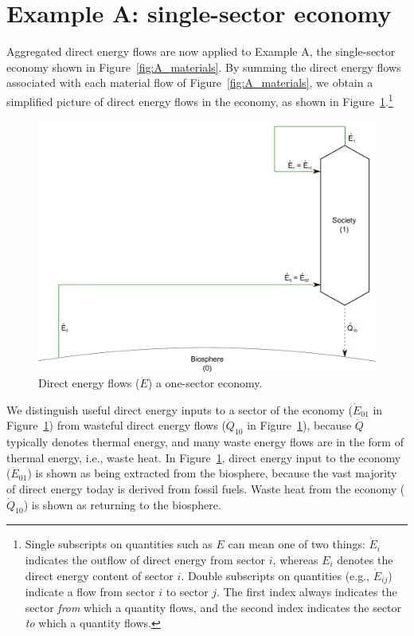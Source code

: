 \section{Example A: single-sector economy} %
\label{sec:A_energy}

Aggregated direct energy flows are now applied to Example A, 
the single-sector economy shown in Figure~\ref{fig:A_materials}.
By summing the direct energy flows associated with
each material flow of Figure~\ref{fig:A_materials}, we obtain
a simplified picture of direct energy flows in the economy,
as shown in Figure~\ref{fig:A_energy}.\footnote{Single 
subscripts on quantities such as
$E$ can mean one of two things: 
$\dot{E}_{i}$ indicates the outflow of direct energy from sector $i$, 
whereas $E_{i}$ denotes the direct energy content of sector $i$. 
Double subscripts on quantities
(e.g., $\dot{E}_{ij}$) indicate a flow 
from sector $i$ to sector $j$. 
The first index always indicates the sector \emph{from} which a quantity flows, 
and the second index indicates the sector \emph{to} which a quantity flows.}

\begin{figure}[!ht]
\centering
\includegraphics[width=0.8\linewidth]{Part_1/Chapter_Energy/images/1_sector_direct_energy.pdf}
\caption[Direct energy flows a one-sector economy]{Direct energy flows ($\dot{E}$) a one-sector economy.}
\label{fig:A_energy}
\end{figure}

We distinguish useful direct energy inputs to a sector of the economy
($\dot{E}_{01}$ in Figure~\ref{fig:A_energy}) from wasteful direct energy flows 
($\dot{Q}_{10}$ in Figure~\ref{fig:A_energy}), 
because $\dot{Q}$ typically denotes thermal energy, 
and many waste energy flows are in the form of thermal
energy, i.e., waste heat. In Figure~\ref{fig:A_energy}, direct energy input to the 
economy ($\dot{E}_{01}$) is shown as being extracted from the biosphere, because
the vast majority of direct energy today is derived from fossil fuels.
Waste heat from the economy ($\dot{Q}_{10}$) is shown as returning 
to the biosphere.

